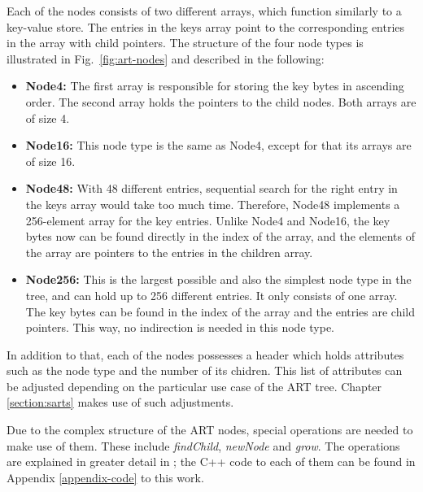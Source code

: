 Each of the nodes consists of two different arrays, which function similarly to a key-value store. The entries in the keys array point to the corresponding entries in the array with child pointers. The structure of the four node types is illustrated in Fig.~\ref{fig:art-nodes} and described in the following: 
\begin{itemize}
	\item \textbf{Node4:} The first array is responsible for storing the key bytes in ascending order. The second array holds the pointers to the child nodes. Both arrays are of size 4. 
	\item \textbf{Node16:} This node type is the same as Node4, except for that its arrays are of size 16. 
	\item \textbf{Node48:} With 48 different entries, sequential search for the right entry in the keys array would take too much time. Therefore, Node48 implements a 256-element array for the key entries. Unlike Node4 and Node16, the key bytes now can be found directly in the index of the array, and the elements of the array are pointers to the entries in the children array. 
	\item \textbf{Node256:} This is the largest possible and also the simplest node type in the tree, and can hold up to 256 different entries. It only consists of one array. The key bytes can be found in the index of the array and the entries are child pointers. This way, no indirection is needed in this node type. 
\end{itemize}
In addition to that, each of the nodes possesses a header which holds attributes such as the node type and the number of its chidren. This list of attributes can be adjusted depending on the particular use case of the ART tree. Chapter \ref{section:sarts} makes use of such adjustments. 

Due to the complex structure of the ART nodes, special operations are needed to make use of them. These include \textit{findChild}, \textit{newNode} and \textit{grow}. The operations are explained in greater detail in \cite{art}; the C++ code to each of them can be found in Appendix \ref{appendix-code} to this work. 

